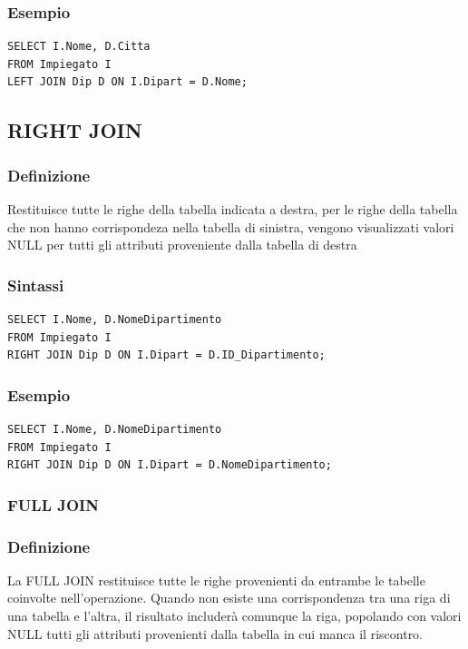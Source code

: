 \subsubsection{Esempio}
\begin{lstlisting}[language=sql_generic]
SELECT I.Nome, D.Citta
FROM Impiegato I
LEFT JOIN Dip D ON I.Dipart = D.Nome;
\end{lstlisting}

\subsection{RIGHT JOIN}
\subsubsection{Definizione}
Restituisce tutte le righe della tabella indicata a destra, per le righe della tabella che non hanno corrispondeza nella tabella di sinistra, vengono visualizzati valori NULL per tutti gli attributi proveniente dalla tabella di destra

\subsubsection{Sintassi}
\begin{lstlisting}[language=sql_generic]
SELECT I.Nome, D.NomeDipartimento
FROM Impiegato I
RIGHT JOIN Dip D ON I.Dipart = D.ID_Dipartimento;
\end{lstlisting}

\subsubsection{Esempio}
\begin{lstlisting}[language=sql_generic]
SELECT I.Nome, D.NomeDipartimento
FROM Impiegato I
RIGHT JOIN Dip D ON I.Dipart = D.NomeDipartimento;
\end{lstlisting}

\subsubsection{FULL JOIN}
\subsubsection{Definizione}
La FULL JOIN restituisce tutte le righe provenienti da entrambe le tabelle coinvolte nell'operazione. Quando non esiste una corrispondenza tra una riga di una tabella e l'altra, il risultato includerà comunque la riga, popolando con valori NULL tutti gli attributi provenienti dalla tabella in cui manca il riscontro.

